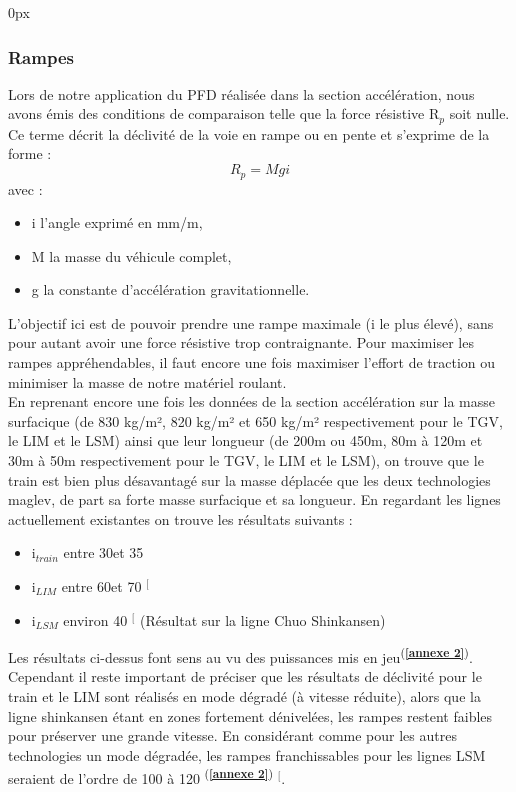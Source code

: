 \documentclass[12pt, a4paper, onecolumn]{article}
\makeatletter
\renewcommand{\tab}{\tabto{15px}}
\newcommand{\csvdel}{}
\newcommand{\bettercite}[1][,]{%
  \renewcommand{\csvdel}{\renewcommand{\csvdel}{}}%
  \csname\endcsname$^[$\checknextarg}
\newcommand{\checknextarg}{\@ifnextchar\bgroup{\gobblenext}{}}%
\newcommand{\gobblenext}[1]{\csvdel\textcolor{blue}{\textbf{\cite{#1}}}\@ifnextchar\bgroup{$^,$\gobblenext}{$^]$}}%
\newcommand{\cfannexe}[1]{\textsuperscript{(\textcolor{blue}{\textbf{\ref{annexe #1}}})}}
\makeatother
\begin{document}
\begin{addmargin}[30px]{0px} \subsubsection*{Rampes}\end{addmargin}
\tab Lors de notre application du PFD réalisée dans la section accélération, nous avons émis des conditions de comparaison telle que la force résistive R$_p$ soit nulle.
Ce terme décrit la déclivité de la voie en rampe ou en pente et s’exprime de la forme : \\
$$R_p = Mgi$$
avec : \\
\begin{itemize}
  \item i l'angle exprimé en mm/m,
  \item M la masse du véhicule complet,
  \item g la constante d’accélération gravitationnelle.
\end{itemize}
\tab L’objectif ici est de pouvoir prendre une rampe maximale (i le plus élevé), sans pour autant avoir une force résistive trop contraignante.
Pour maximiser les rampes appréhendables, il faut encore une fois maximiser l’effort de traction ou minimiser la masse de notre matériel roulant. \\
\linebreak
\tab En reprenant encore une fois les données de la section accélération sur la masse surfacique (de 830 kg/m², 820 kg/m² et 650 kg/m² respectivement pour le TGV, le LIM et le LSM) ainsi que leur longueur (de 200m ou 450m, 80m à 120m et 30m à 50m respectivement pour le TGV, le LIM et le LSM), on trouve que le train est bien plus désavantagé sur la masse déplacée que les deux technologies maglev, de part sa forte masse surfacique et sa longueur.
En regardant les lignes actuellement existantes on trouve les résultats suivants : \\
\begin{itemize}
  \item i$_{train}$ entre 30\textperthousand et 35\textperthousand
  \item i$_{LIM}$ entre 60\textperthousand et 70\textperthousand\bettercite{incheonairport}
  \item i$_{LSM}$ environ 40\textperthousand\bettercite{chuoshinkansen} (Résultat sur la ligne Chuo Shinkansen)
\end{itemize}

\tab Les résultats ci-dessus font sens au vu des puissances mis en jeu\cfannexe{2}.
Cependant il reste important de préciser que les résultats de déclivité pour le train et le LIM sont réalisés en mode dégradé (à vitesse réduite), alors que la ligne shinkansen étant en zones fortement dénivelées, les rampes restent faibles pour préserver une grande vitesse.
En considérant comme pour les autres technologies un mode dégradée, les rampes franchissables pour les lignes LSM seraient de l’ordre de 100 \textperthousand \:à 120 \textperthousand\cfannexe{2}\bettercite{maglevus}.
\end{document}
